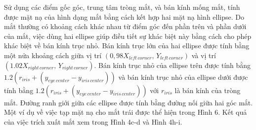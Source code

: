 \documentclass[conference]{IEEEtran}
\begin{document}
Sử dụng các điểm gốc góc, trung tâm tròng mắt, và bán kính mống mắt, tính được mặt nạ của hình dạng mắt bằng cách kết hợp hai mặt nạ hình ellipse. Do mắt thường có khoảng cách khác nhau từ điểm góc đến phần trên và phần dưới của mắt, việc dùng hai ellipse giúp điều tiết sự khác biệt này bằng cách cho phép khác biệt về bán kính trục nhỏ. Bán kính trục lớn của hai ellipse được tính bằng một nửa khoảng cách giữa vị trí $(0,98X_{left\, corner},\, Y_{left\, corner})$ và vị trí $(1.02X_{right\, corner}, \, Y_{right\,corner})$. Bán kính trục nhỏ của ellipse trên được tính bằng $1.2(r_{iris}+(y_{eye\,center}-y_{iris\,center}))$ và bán kính trục nhỏ của ellipse dưới được tính bằng $1.2(r_{iris}+(y_{eye\,center}-y_{iris\,center}))$ với $r_{iris}$ là bán kính của tròng mắt. Đường ranh giới giữa các ellipse được tính bằng đường nối giữa hai góc mắt. Một ví dụ về việc tạp mặt nạ cho mắt trái được thể hiện trong Hình 6. Kết quả của việc trích xuất mắt xem trong Hình 4c-d và Hình 4h-i.
\end{document}

